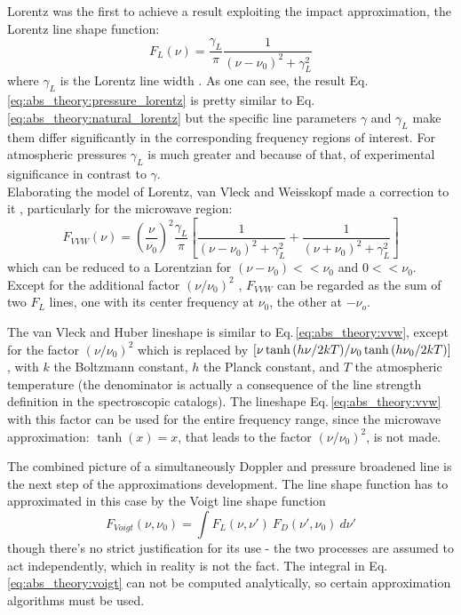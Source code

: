 Lorentz was the first to achieve a result exploiting the impact
approximation, the Lorentz line shape function:
\begin{equation}\label{eq:abs_theory:pressure_lorentz}
 F_L(\nu)=\frac{\gamma_L}{\pi}\frac{1}{(\nu-\nu_0)^2+\gamma_L^2}
\end{equation}
where $\gamma_L$ is the Lorentz line width \citep{thorne:99}. As one
can see, the result Eq.\,\ref{eq:abs_theory:pressure_lorentz} is pretty similar to
Eq.\,\ref{eq:abs_theory:natural_lorentz} but the specific line parameters $\gamma$
and $\gamma_L$ make them differ significantly in the corresponding
frequency regions of interest. For atmospheric pressures $\gamma_L$ is
much greater and because of that, of experimental
significance in contrast to $\gamma$.\\
Elaborating the model of Lorentz, van Vleck and Weisskopf made a
correction to it \citep{vanvleck:45}, particularly for the microwave
region:
\begin{equation}\label{eq:abs_theory:vvw}
 F_{VVW} (\nu)=\left(\frac{\nu}{\nu_0}\right)^2\frac{\gamma_L}{\pi}
 \left[\frac{1}{(\nu-\nu_0)^2+\gamma_L^2}+\frac{1}{(\nu+\nu_0)^2+\gamma_L^2}\right]
\end{equation}
which can be reduced to a Lorentzian for $(\nu-\nu_0) << \nu_0$ and $0
<< \nu_0$. Except for the additional factor $(\nu/\nu_0)^2$ ,
$F_{VVW}$ can be regarded as the sum of two $F_L$
lines, one with its center frequency at $\nu_0$, the other at
$-\nu_o$.

The van Vleck and Huber lineshape \citep{vanvleckhuber:77} is similar
to Eq.\,\ref{eq:abs_theory:vvw}, except for the factor $(\nu/\nu_0)^2$ which is
replaced by $\left[\nu \tanh\left(h\nu\middle/2kT\right)\middle/\nu_0 
\tanh\left(h\nu_0\middle/2kT\right)\right]$, with $k$ the Boltzmann constant, $h$ the Planck
constant, and $T$ the atmospheric temperature (the denominator is
actually a consequence of the line strength definition in the
spectroscopic catalogs). The lineshape Eq.\,\ref{eq:abs_theory:vvw} with this
factor can be used for the entire frequency range, since
the microwave approximation: $\tanh(x) = x$, that leads to the factor
$(\nu/\nu_0)^2$, is not made.

The combined picture of a simultaneously Doppler and pressure
broadened line is the next step of the approximations development. The
line shape function has to approximated in this case by the Voigt line shape
function 
\begin{equation}\label{eq:abs_theory:voigt}
 F_{Voigt}(\nu,\nu_0)= \int F_L(\nu,\nu')~F_D(\nu',\nu_0)~d\nu'
\end{equation}
though there's no strict justification for its use - the two processes
are assumed to act independently, which in reality is not the
fact. The integral in Eq.\,\ref{eq:abs_theory:voigt}
can not be computed analytically, so certain approximation algorithms
must be used.


